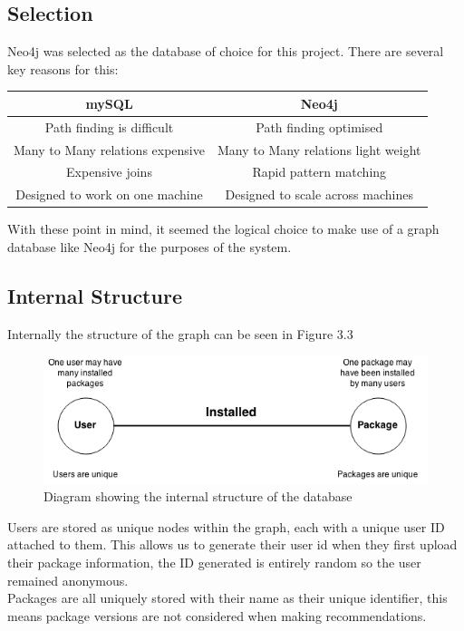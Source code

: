 \documentclass{l4proj}
\begin{document}
\subsection{Selection}
Neo4j was selected as the database of choice for this project. There are several key reasons for this:\\
\begin{center}
\begin{tabular}{|c|c|}
\hline
\textbf{mySQL} & \textbf{Neo4j}\\
\hline
Path finding is difficult & Path finding optimised\\
\hline
Many to Many relations expensive & Many to Many relations light weight\\
\hline
Expensive joins & Rapid pattern matching\\
\hline
Designed to work on one machine & Designed to scale across machines\\
\end{tabular}
\end{center}
With these point in mind, it seemed the logical choice to make use of a graph database like Neo4j for the purposes of the system.

\subsection{Internal Structure}
Internally the structure of the graph can be seen in Figure 3.3
\begin{figure}
\includegraphics[scale=0.9]{images/recommend_graph.png}
\caption{Diagram showing the internal structure of the database}
\end{figure} 
Users are stored as unique nodes within the graph, each with a unique user ID attached to them. This allows us to generate their user id when they first upload their package information, the ID generated is entirely random so the user remained anonymous.\\
Packages are all uniquely stored with their name as their unique identifier, this means package versions are not considered when making recommendations.\\
\end{document}

